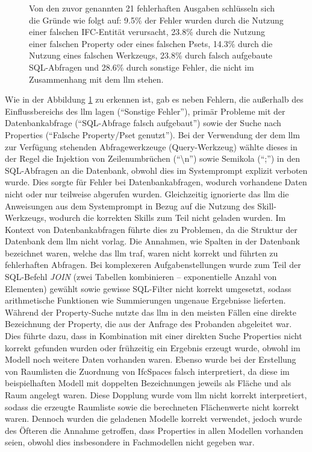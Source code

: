 \begin{figure}[h]
\begin{tikzpicture}
\end{tikzpicture}
\caption[Fehlerergebnisse der \gls{llm}-Auswertung]{Von den zuvor genannten 21 fehlerhaften Ausgaben schlüsseln sich die Gründe wie folgt auf: 9.5\% der Fehler wurden durch die Nutzung einer falschen IFC-Entität verursacht, 23.8\% durch die Nutzung einer falschen Property oder eines falschen Psets, 14.3\% durch die Nutzung eines falschen Werkzeugs, 23.8\% durch falsch aufgebaute SQL-Abfragen und 28.6\% durch sonstige Fehler, die nicht im Zusammenhang mit dem \gls{llm} stehen.}
\label{fig:104_results-ai-errors}
\end{figure}

Wie in der Abbildung \ref{fig:104_results-ai-errors} zu erkennen ist, gab es neben Fehlern, die außerhalb des Einflussbereichs des \gls{llm} lagen (\enquote{Sonstige Fehler}), 
primär Probleme mit der Datenbankabfrage (\enquote{SQL-Abfrage falsch aufgebaut}) sowie der Suche nach Properties (\enquote{Falsche Property/Pset genutzt}). 
Bei der Verwendung der dem \gls{llm} zur Verfügung stehenden Abfragewerkzeuge (Query-Werkzeug) wählte dieses in der Regel die Injektion von Zeilenumbrüchen (\enquote{\textbackslash{n}}) 
sowie Semikola (\enquote{;}) in den SQL-Abfragen an die Datenbank, obwohl dies im Systemprompt explizit verboten wurde. 
Dies sorgte für Fehler bei Datenbankabfragen, wodurch vorhandene Daten nicht oder nur teilweise abgerufen wurden. 
Gleichzeitig ignorierte das \gls{llm} die Anweisungen aus dem Systemprompt in Bezug auf die Nutzung des Skill-Werkzeugs,
wodurch die korrekten Skills zum Teil nicht geladen wurden. Im Kontext von Datenbankabfragen führte dies zu Problemen, da die Struktur der Datenbank dem \gls{llm} nicht vorlag.
Die Annahmen, wie Spalten in der Datenbank bezeichnet waren, welche das \gls{llm} traf, waren nicht korrekt und führten zu fehlerhaften Abfragen.
Bei komplexeren Aufgabenstellungen wurde zum Teil der SQL-Befehl \textit{JOIN} (zwei Tabellen kombinieren -- exponentielle Anzahl von Elementen) gewählt sowie gewisse SQL-Filter nicht korrekt umgesetzt,
sodass arithmetische Funktionen wie Summierungen ungenaue Ergebnisse lieferten. Während der Property-Suche nutzte das \gls{llm} in den meisten Fällen eine direkte Bezeichnung der Property, 
die aus der Anfrage des Probanden abgeleitet war. Dies führte dazu, dass in Kombination mit einer direkten Suche Properties nicht korrekt gefunden wurden oder frühzeitig ein Ergebnis erzeugt wurde,
obwohl im Modell noch weitere Daten vorhanden waren. Ebenso wurde bei der Erstellung von Raumlisten die Zuordnung von IfcSpaces falsch interpretiert,
da diese im beispielhaften Modell mit doppelten Bezeichnungen jeweils als Fläche und als Raum angelegt waren. Diese Dopplung wurde vom \gls{llm} nicht korrekt interpretiert,
sodass die erzeugte Raumliste sowie die berechneten Flächenwerte nicht korrekt waren. Dennoch wurden die geladenen Modelle korrekt verwendet,
jedoch wurde des Öfteren die Annahme getroffen, dass Properties in allen Modellen vorhanden seien, obwohl dies insbesondere in Fachmodellen nicht gegeben war. \\

